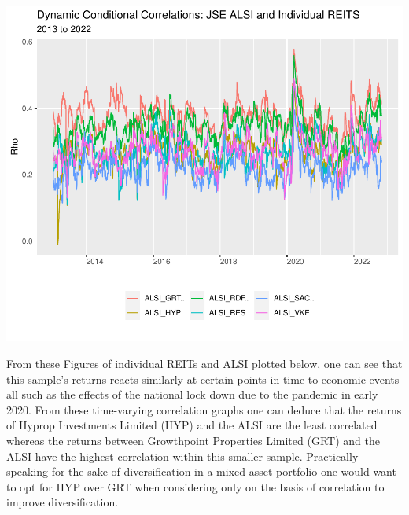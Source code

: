\documentclass[11pt,preprint, authoryear]{elsarticle}
\let\origfigure\figure
\let\endorigfigure\endfigure
\renewenvironment{figure}[1][2] {
    \expandafter\origfigure\expandafter[H]
} {
    \endorigfigure
}
\numberwithin{equation}{section}
\numberwithin{figure}{section}
\numberwithin{table}{section}
\begin{document}
\begin{figure}
\centering
\includegraphics{Fin_Metrics_Project_files/figure-latex/unnamed-chunk-10-1.pdf}
\caption{Dynamic Conditional Correlations Graph}
\end{figure}

From these Figures of individual REITs and ALSI plotted below, one can
see that this sample's returns reacts similarly at certain points in
time to economic events all such as the effects of the national lock
down due to the pandemic in early 2020. From these time-varying
correlation graphs one can deduce that the returns of Hyprop Investments
Limited (HYP) and the ALSI are the least correlated whereas the returns
between Growthpoint Properties Limited (GRT) and the ALSI have the
highest correlation within this smaller sample. Practically speaking for
the sake of diversification in a mixed asset portfolio one would want to
opt for HYP over GRT when considering only on the basis of correlation
to improve diversification.
\end{document}
